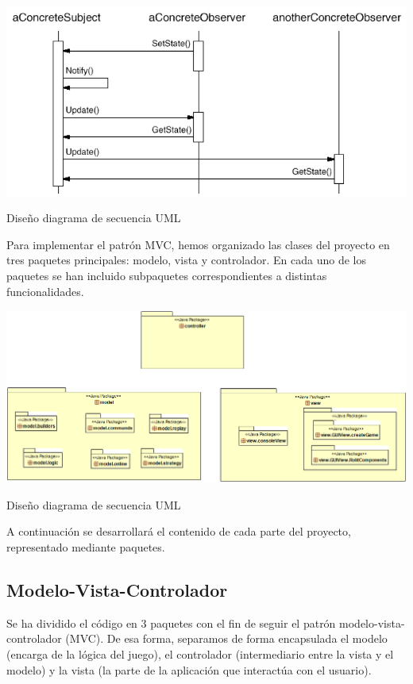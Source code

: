 \documentclass[../DocumentoOficial.tex]{subfiles}
\begin{document}
\begin{center}
\includegraphics[scale=0.5]{observer2.png}

Diseño diagrama de secuencia UML
\end{center}

Para implementar el patrón MVC, hemos organizado las clases del proyecto en tres paquetes principales: modelo, vista y controlador. En cada uno de los paquetes se han incluido subpaquetes correspondientes a distintas funcionalidades.

\begin{center}
\includegraphics[scale=0.4]{mvcumlsimple.png}

Diseño diagrama de secuencia UML
\end{center}

A continuación se desarrollará el contenido de cada parte del proyecto, representado mediante paquetes.

\subsection{Modelo-Vista-Controlador}

Se ha dividido el código en 3 paquetes con el fin de seguir el patrón modelo-vista-controlador (MVC). De esa forma, separamos de forma encapsulada el modelo (encarga de la lógica del juego), el controlador (intermediario entre la vista y el modelo) y la vista (la parte de la aplicación que interactúa con el usuario).
\end{document}
